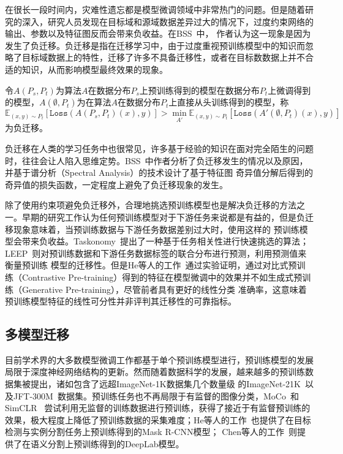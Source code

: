 在很长一段时间内，灾难性遗忘都是模型微调领域中非常热门的问题。但是随着研究的深入，研究人员发现在目标域和源域数据差异过大的情况下，过度约束网络的输出、参数以及特征图反而会带来负收益。在BSS~\citep{chen2019catastrophic}中，
作者认为这一现象是因为发生了负迁移。负迁移是指在迁移学习中，由于过度重视预训练模型中的知识而忽略了目标域数据上的特性，迁移了许多不具备迁移性，或者在目标数数据上并不合适的知识，从而影响模型最终效果的现象。

\begin{definition}
    令$A(P_s,P_t)$为算法$A$在数据分布$P_s$上预训练得到的模型在数据分布$P_t$上微调得到的模型，$A(\emptyset,P_t)$为在算法$A$在数据分布$P_t$上直接从头训练得到的模型，称
    \begin{equation}
        \mathbb{E}_{(x,y)\sim P_t}[\texttt{Loss}(A(P_s,P_t)(x),y)] > \mathop {\min} \limits_{ A'} \mathbb{E}_{(x,y)\sim P_t}[\texttt{Loss}(A'(\emptyset,P_t)(x),y)]
    \end{equation}
    为负迁移。
\end{definition} 

负迁移在人类的学习任务中也很常见，许多基于经验的知识在面对完全陌生的问题时，往往会让人陷入思维定势。BSS~\citep{chen2019catastrophic}中作者分析了负迁移发生的情况以及原因，并基于谱分析（Spectral Analysis）的技术设计了基于特征图
奇异值分解后得到的奇异值的损失函数，一定程度上避免了负迁移现象的发生。

除了使用约束项避免负迁移外，合理地挑选预训练模型也是解决负迁移的方法之一。早期的研究工作认为任何预训练模型对于下游任务来说都是有益的，但是负迁移现象意味着，当预训练数据与下游任务数据差别过大时，使用这样的
预训练模型会带来负收益。Taskonomy~\citep{zamir_taskonomy:_2018}提出了一种基于任务相关性进行快速挑选的算法；LEEP~\citep{nguyen2020leep}则对预训练数据和下游任务数据标签的联合分布进行预测，利用预测值来衡量预训练
模型的迁移性。但是He等人的工作~\citep{he2021masked}通过实验证明，通过对比式预训练（Contrastive Pre-training）得到的特征在模型微调中的效果并不如生成式预训练（Generative Pre-training），尽管前者具有更好的线性分类
准确率，这意味着预训练模型特征的线性可分性并非评判其迁移性的可靠指标。

\subsection{多模型迁移}

目前学术界的大多数模型微调工作都基于单个预训练模型进行，预训练模型的发展局限于深度神经网络结构的更新。然而随着数据科学的发展，越来越多的预训练数据集被提出，诸如包含了远超ImageNet-1K数据集几个数量级
的ImageNet-21K~\citep{deng2009imagenet}以及JFT-300M~\citep{sun2017revisiting}数据集。预训练任务也不再局限于有监督的图像分类，MoCo~\citep{he2020momentum}和SimCLR~\citep{chen_simple_2020}
尝试利用无监督的训练数据进行预训练，获得了接近于有监督预训练的效果，极大程度上降低了预训练数据的采集难度；He等人的工作~\citep{he2017mask}也提供了在目标检测与实例分割任务上预训练得到的Mask R-CNN模型；
Chen等人的工作~\citep{chen2018encoder}则提供了在语义分割上预训练得到的DeepLab模型。

